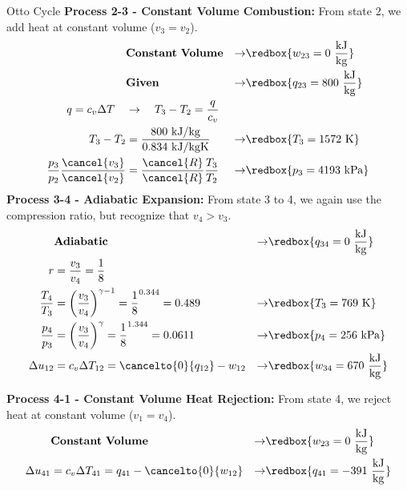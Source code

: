 \begin{example}[label=ex:ch3_otto]{Otto Cycle}
{\bf Process 2-3 - Constant Volume Combustion:}
From state 2, we add heat at constant volume ($v_3 = v_2$).
\begin{align*}
  &{\rm \bf Constant\ Volume} &\rightarrow& \redbox{w_{23} = 0\ \frac{\rm kJ}{\rm kg}} \\
   &{\rm \bf Given} &\rightarrow& \redbox{q_{23} = 800\ \frac{\rm kJ}{\rm kg}} \\
  q = c_v \Delta T \quad&\rightarrow\quad T_3 - T_2 = \frac{q}{c_v} \\
  T_3 - T_2 &= \frac{800\ \rm kJ/kg}{0.834\ \rm kJ/kgK} &\rightarrow &\redbox{T_3 = 1572 \ {\rm K}}\\
  \frac{p_3 }{p_2 } \frac{\cancel{v_3}}{\cancel{v_2}}&= \frac{\cancel{R}}{\cancel{R}}\frac{T_3}{T_2} &\rightarrow &\redbox{p_3 = 4193\ {\rm kPa}}
\end{align*}
\newpage
{\bf Process 3-4 - Adiabatic Expansion:}
From state 3 to 4, we again use the compression ratio, but recognize that $v_4 > v_3$.
\begin{align*}
  &{\rm \bf Adiabatic} &\rightarrow& \redbox{q_{34} = 0\ \frac{\rm kJ}{\rm kg}} \\
  r &= \frac{v_3}{v_4} = \frac{1}{8} \\
  \frac{T_4}{T_3} &= \left(\frac{v_3}{v_4}\right)^{\gamma -1} = \frac{1}{8}^{0.344} = 0.489 &\rightarrow &\redbox{T_3 = 769\ {\rm K}} \\
  \frac{p_4}{p_3} &= \left(\frac{v_3}{v_4}\right)^{\gamma} = \frac{1}{8}^{1.344} = 0.0611 &\rightarrow &\redbox{p_4 = 256\ {\rm kPa}} \\
  \Delta u_{12} &= c_v \Delta T_{12} = \cancelto{0}{q_{12}} - w_{12} &\rightarrow& \redbox{w_{34} = 670\ \frac{\rm kJ}{\rm kg}}
\end{align*}

{\bf Process 4-1 - Constant Volume Heat Rejection:}
From state 4, we reject heat at constant volume ($v_1 = v_4$).
\begin{align*}
  &{\rm \bf Constant\ Volume} &\rightarrow& \redbox{w_{23} = 0\ \frac{\rm kJ}{\rm kg}} \\
  \Delta u_{41} &= c_v \Delta T_{41} = q_{41} - \cancelto{0}{w_{12}} &\rightarrow& \redbox{q_{41} = -391\ \frac{\rm kJ}{\rm kg}}
\end{align*}


\end{example}
